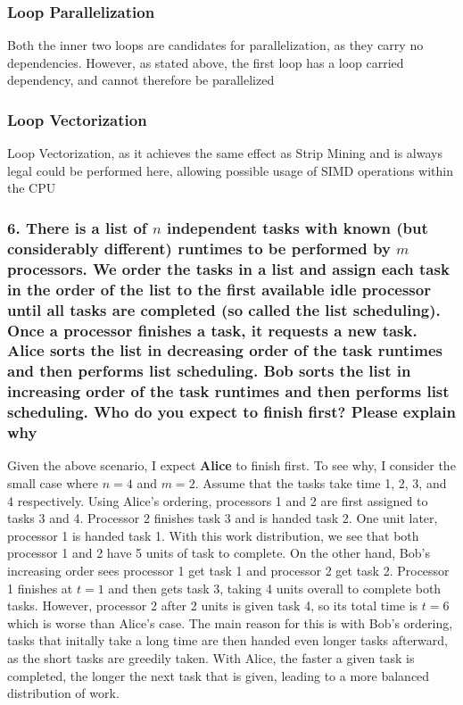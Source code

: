 \documentclass[titlepage]{article}
\begin{document}
\subsubsection*{Loop Parallelization}
Both the inner two loops are candidates for parallelization, as they carry no dependencies. However, as stated
above, the first loop has a loop carried dependency, and cannot therefore be parallelized
\subsubsection*{Loop Vectorization}
Loop Vectorization, as it achieves the same effect as Strip Mining and is always legal could be performed here,
allowing possible usage of SIMD operations within the CPU

\subsubsection*{6. There is a list of $n$ independent tasks with known (but considerably different) runtimes to be
performed by $m$ processors. We order the tasks in a list and assign each task in the order of
the list to the first available idle processor until all tasks are completed (so called the list
scheduling). Once a processor finishes a task, it requests a new task. Alice sorts the list in
decreasing order of the task runtimes and then performs list scheduling. Bob sorts the list in
increasing order of the task runtimes and then performs list scheduling. Who do you expect to
finish first? Please explain why}
Given the above scenario, I expect \textbf{Alice} to finish first. To see why, I consider the small case where $n = 4$ and
$m = 2$. Assume that the tasks take time 1, 2, 3, and 4 respectively. Using Alice's ordering, processors 1 and 2 are first assigned to
tasks 3 and 4. Processor 2 finishes task 3 and is handed task 2. One unit later, processor 1 is handed task 1. With this work distribution,
we see that both processor 1 and 2 have 5 units of task to complete. On the other hand, Bob's increasing order sees processor 1 get task 1
and processor 2 get task 2. Processor 1 finishes at $t=1$ and then gets task 3, taking 4 units overall to complete both tasks. However,
processor 2 after 2 units is given task 4, so its total time is $t=6$ which is worse than Alice's case. The main reason for this is with Bob's
ordering, tasks that initally take a long time are then handed even longer tasks afterward, as the short tasks are greedily taken. With Alice,
the faster a given task is completed, the longer the next task that is given, leading to a more balanced distribution of work.
\end{document}
